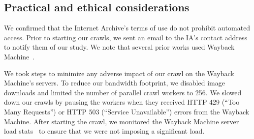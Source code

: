 \subsection{Practical and ethical considerations}
\label{subsec:practical-matters}
We confirmed that the Internet Archive’s terms of use do not prohibit automated access. Prior to starting our crawls, we sent an email to the IA’s contact address to notify them of our study.
We note that several prior works used Wayback Machine~\cite{lerner2016internet, lerner2017rewriting,brunelle2015not,brunelle2016impact}.

We took steps to minimize any adverse impact of our crawl on the Wayback Machine’s servers.
To reduce our bandwidth footprint, we disabled image downloads and limited the number of parallel crawl workers to 256.
We slowed down our crawls by pausing the workers when they received HTTP 429 (``Too Many Requests'') or HTTP 503 (``Service Unavailable'') errors from the Wayback Machine. 
After starting the crawl, we monitored the Wayback Machine server load stats~\cite{Wayback-Stats} to ensure that we were not imposing a significant load.


